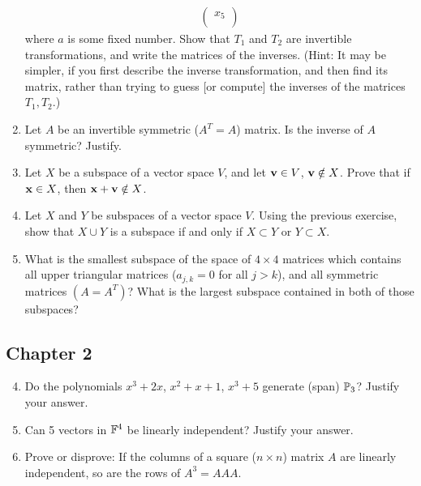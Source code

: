\documentclass[../psets.tex]{subfiles}
\begin{document}
\begin{enumerate}[label={\textbf{6.\arabic*.}}]
\begin{align*}
\begin{pmatrix}
            x_5\\
        \end{pmatrix}
    \end{align*}
    where $a$ is some fixed number. Show that $T_1$ and $T_2$ are invertible transformations, and write the matrices of the inverses. (Hint: It may be simpler, if you first describe the inverse transformation, and then find its matrix, rather than trying to guess [or compute] the inverses of the matrices $T_1,T_2$.)
    \setcounter{enumi}{12}
    \item Let $A$ be an invertible symmetric ($A^T=A$) matrix. Is the inverse of $A$ symmetric? Justify.
\end{enumerate}

\begin{enumerate}[label={\textbf{7.\arabic*.}}]
    \setcounter{enumi}{2}
    \item Let $X$ be a subspace of a vector space $V$, and let $\mathbf{v}\in V$, $\mathbf{v}\notin X$. Prove that if $\mathbf{x}\in X$, then $\mathbf{x}+\mathbf{v}\notin X$.
    \item Let $X$ and $Y$ be subspaces of a vector space $V$. Using the previous exercise, show that $X\cup Y$ is a subspace if and only if $X\subset Y$ or $Y\subset X$.
    \item What is the smallest subspace of the space of $4\times 4$ matrices which contains all upper triangular matrices ($a_{j,k}=0$ for all $j>k$), and all symmetric matrices $(A=A^T)$? What is the largest subspace contained in both of those subspaces?
\end{enumerate}


\subsection*{Chapter 2}
\begin{enumerate}[label={\textbf{3.\arabic*.}}]
    \setcounter{enumi}{3}
    \item Do the polynomials $x^3+2x$, $x^2+x+1$, $x^3+5$ generate (span) $\mathbb{P}_3$? Justify your answer.
    \item Can 5 vectors in $\mathbb{F}^4$ be linearly independent? Justify your answer.
    \item Prove or disprove: If the columns of a square ($n\times n$) matrix $A$ are linearly independent, so are the rows of $A^3=AAA$.
\end{enumerate}
\end{document}
